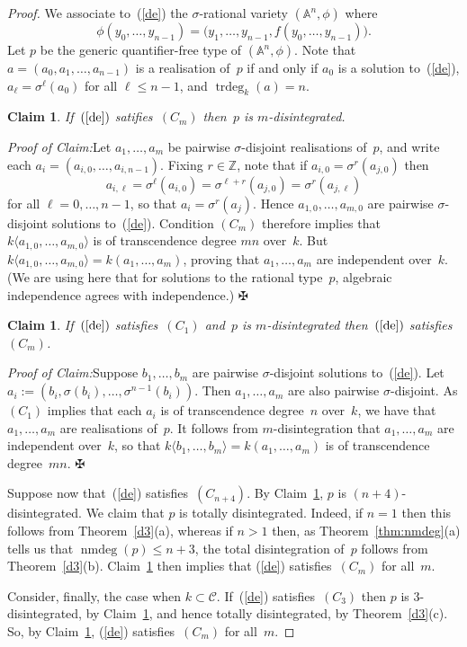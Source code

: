 \documentclass[\DocOpts]{amsart}
\newtheorem{claim}[theorem]{Claim}
\theoremstyle{definition}
\def\trdeg{\operatorname{trdeg}}
\def\nmdeg{\operatorname{nmdeg}}
\def\C{\mathcal{C}}
\def\ZZ{\mathbb{Z}}
\renewcommand{\AA}{\mathbb{A}}
\newcommand{\<}{\langle}
\renewcommand{\>}{\rangle}
\newcommand{\qedv}{\vspace{.1in}\hfill\(\maltese\)}
\newenvironment{claimproof}[1]{%
\par\vspace{.1in}\noindent\emph{Proof of Claim:}\space#1}{\qedv}
\begin{document}
\begin{proof}
We associate to~(\ref{de}) the $\sigma$-rational variety $(\AA^n, \phi)$ where
$$\phi(y_0,\dots,y_{n-1})=\big(y_1,\dots, y_{n-1}, f(y_0,\dots,y_{n-1})\big).$$
Let $p$ be the generic quantifier-free type of $(\AA^n,\phi)$.
Note that $a=(a_0,a_1,\dots,a_{n-1})$ is a realisation of~$p$ if and only if $a_0$ is a solution to~(\ref{de}), $a_\ell=\sigma^\ell(a_0)$ for all $\ell\leq n-1$, and $\trdeg_k(a)=n$.

\begin{claim}
\label{ctod}
If~$(\ref{de})$ satifies~$(C_m)$  then~$p$ is $m$-disintegrated.
\end{claim}
\begin{claimproof}
Let $a_1,\dots,a_m$ be pairwise $\sigma$-disjoint realisations of~$p$, and write each $a_i=(a_{i,0},\dots,a_{i,n-1})$.
Fixing $r\in\ZZ$, note that if $a_{i,0}=\sigma^r(a_{j,0})$ then
$$a_{i,\ell}=\sigma^\ell(a_{i,0})=\sigma^{\ell+r}(a_{j,0})=\sigma^r(a_{j,\ell})$$
for all $\ell=0,\dots,n-1$, so that $a_i=\sigma^r(a_j)$.
Hence $a_{1,0},\dots,a_{m,0}$ are pairwise $\sigma$-disjoint solutions to~(\ref{de}).
Condition $(C_m)$ therefore implies that $k\langle a_{1,0},\dots,a_{m,0}\rangle$ is of transcendence degree $mn$ over~$k$.
But $k\langle a_{1,0},\dots,a_{m,0}\rangle=k(a_1,\dots,a_m)$, proving that $a_1,\dots,a_m$ are independent over~$k$.
(We are using here that for solutions to the rational type~$p$, algebraic independence agrees with independence.)
\end{claimproof}

\begin{claim}
\label{dtoc}
If~$(\ref{de})$ satisfies~$(C_1)$  and~$p$ is $m$-disintegrated then~$(\ref{de})$ satisfies~$(C_m)$.
\end{claim}
\begin{claimproof}
Suppose $b_1,\dots, b_m$ are pairwise $\sigma$-disjoint solutions to~(\ref{de}).
Let $a_i:=(b_i,\sigma(b_i),\dots,\sigma^{n-1}(b_i))$.
Then $a_1,\dots,a_m$ are also pairwise $\sigma$-disjoint.
As $(C_1)$ implies that each $a_i$ is of transcendence degree~$n$ over~$k$, we have that $a_1,\dots, a_m$ are realisations of~$p$.
It follows from $m$-disintegration that $a_1,\dots, a_m$ are independent over~$k$,
so that $k\langle b_1,\dots,b_m\rangle=k(a_1,\dots,a_m)$ is of transcendence degree~$mn$.
\end{claimproof}

Suppose now that~(\ref{de}) satisfies~$(C_{n+4})$.
By Claim~\ref{ctod}, $p$ is $(n+4)$-disintegrated.
We claim that $p$ is totally disintegrated.
Indeed, if $n=1$ then this follows from Theorem~\ref{d3}(a), whereas if $n>1$ then, as Theorem~\ref{thm:nmdeg}(a) tells us that $\nmdeg(p)\leq n+3$, the total disintegration of~$p$ follows from Theorem~\ref{d3}(b).
Claim~\ref{dtoc} then implies that (\ref{de}) satisfies~$(C_m)$ for all~$m$.

Consider, finally, the case when $k\subset\C$.
If~(\ref{de}) satisfies~$(C_3)$ then $p$ is $3$-disintegrated, by Claim~\ref{ctod}, and hence totally disintegrated, by Theorem~\ref{d3}(c).
So, by Claim~\ref{dtoc}, (\ref{de}) satisfies~$(C_m)$ for all~$m$.
\end{proof}
\end{document}
